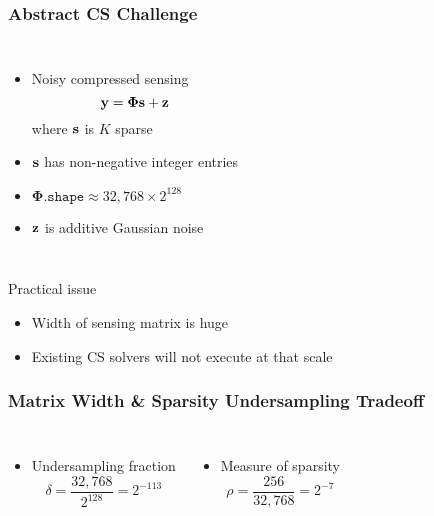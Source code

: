
\begin{frame}
\frametitle{Abstract CS Challenge}
\begin{columns}
  \begin{itemize}
  \item Noisy compressed sensing
  \begin{equation*}
  \mathbf{y} = \boldsymbol{\Phi} \mathbf{s} + \mathbf{z}
  \end{equation*}
  where $\mathbf{s}$ is $K$ sparse
  \item $\mathbf{s}$ has non-negative integer entries
  \item $\boldsymbol{\Phi}.\mathtt{shape} \approx 32,768 \times 2^{128}$
  \item $\mathbf{z}$ is additive Gaussian noise
  \end{itemize}
  \hspace{-1cm} \scalebox{0.75}{}
\end{columns}
\vfill
\begin{alertblock}{Practical issue}
  \begin{itemize}
  \item Width of sensing matrix is huge
  \item Existing CS solvers will not execute at that scale
  \end{itemize}
\end{alertblock}
\end{frame}


\begin{frame} \frametitle{Matrix Width \& Sparsity Undersampling Tradeoff}
\begin{center}  \end{center}
\begin{columns}
\begin{itemize}
\item Undersampling fraction \[ \delta = \frac{32,768}{2^{128}} = 2^{-113} \]
\end{itemize}
\begin{itemize}
\item Measure of sparsity \[ \rho = \frac{256}{32,768} = 2^{-7} \]
\end{itemize}
\end{columns}
\end{frame}

